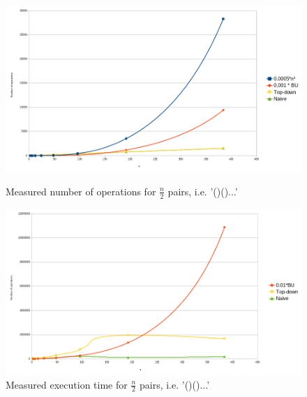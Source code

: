 \documentclass[12pt]{extarticle}
\begin{document}
\begin{figure}[!htb]
\begin{minipage}{0.48\textwidth}
  \label{fig:plr}
  \centering
  \includegraphics[width=\linewidth]{paren/complexity_paren_left_right}
  \caption{Measured number of operations for $\frac n2$ pairs, i.e. '()()...'}
\end{minipage}\hfill
\begin{minipage}{0.48\textwidth}
  \centering
  \includegraphics[width=\linewidth]{paren/time_paren_left_right}
  \caption{Measured execution time for $\frac n2$ pairs, i.e. '()()...'}
\end{minipage}
\end{figure}
\end{document}
